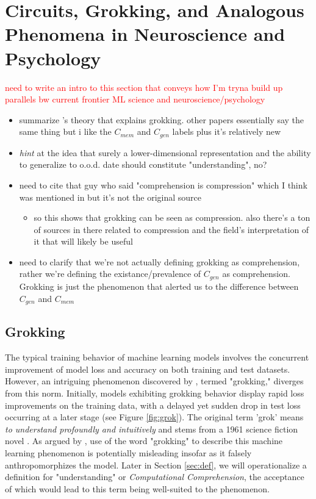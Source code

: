 \documentclass{article}
\begin{document}
\section{Circuits, Grokking, and Analogous Phenomena in Neuroscience and Psychology}
\label{sec:grok&neuro}

\textcolor{red}{need to write an intro to this section that conveys how I'm tryna build up parallels bw current frontier ML science and neuroscience/psychology}

\begin{itemize}
    \item summarize \cite{varma2023explaining}'s theory that explains grokking. other papers essentially say the same thing but i like the $C_{mem}$ and $C_{gen}$ labels plus it's relatively new
    \item \textit{hint} at the idea that surely a lower-dimensional representation and the ability to generalize to o.o.d. date should constitute "understanding", no?
    \item need to cite that guy who said "comprehension is compression" which I think was mentioned in \cite{dodig2023computational} but it's not the original source
    \begin{itemize}
        \item so this \cite{liu2023grokking} shows that grokking can be seen as compression. also there's a ton of sources in there related to compression and the field's interpretation of it that will likely be useful
    \end{itemize}
    \item need to clarify that we're not actually defining grokking as comprehension, rather we're defining the existance/prevalence of $C_{gen}$ as comprehension. Grokking is just the phenomenon that alerted us to the difference between $C_{gen}$ and $C_{mem}$
\end{itemize}

\subsection{Grokking}
\label{subsec:grok&neuro-grok}

The typical training behavior of machine learning models involves the concurrent improvement of model loss and accuracy on both training and test datasets. 
However, an intriguing phenomenon discovered by \cite{power2022grokking}, termed "grokking," diverges from this norm. 
Initially, models exhibiting grokking behavior display rapid loss improvements on the training data, with a delayed yet sudden drop in test loss occurring at a later stage (see Figure \ref{fig:grok}).  
The original term 'grok' means \textit{to understand profoundly and intuitively} and stems from a 1961 science fiction novel \cite{mw2023grok}. 
As argued by \cite{pope2023grok}, use of the word "grokking" to describe this machine learning phenomenon is potentially misleading insofar as it falsely anthropomorphizes the model. 
Later in Section \ref{sec:def}, we will operationalize a definition for "understanding" or \textit{Computational Comprehension}, the acceptance of which would lead to this term being well-suited to the phenomenon.\par
\end{document}

